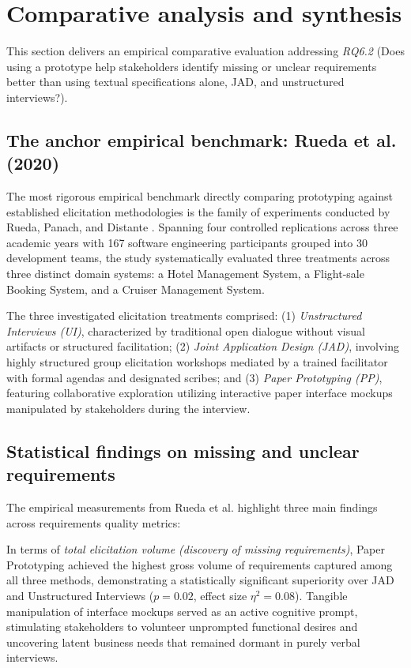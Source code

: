 \section{Comparative analysis and synthesis}
\label{sec:comparative}

This section delivers an empirical comparative evaluation addressing \textit{RQ6.2} (Does using a prototype help stakeholders identify missing or unclear requirements better than using textual specifications alone, JAD, and unstructured interviews?).

\subsection{The anchor empirical benchmark: Rueda et al. (2020)}
The most rigorous empirical benchmark directly comparing prototyping against established elicitation methodologies is the family of experiments conducted by Rueda, Panach, and Distante \cite{rueda2020requirements}. Spanning four controlled replications across three academic years with 167 software engineering participants grouped into 30 development teams, the study systematically evaluated three treatments across three distinct domain systems: a Hotel Management System, a Flight-sale Booking System, and a Cruiser Management System.

The three investigated elicitation treatments comprised: (1) \textit{Unstructured Interviews (UI)}, characterized by traditional open dialogue without visual artifacts or structured facilitation; (2) \textit{Joint Application Design (JAD)}, involving highly structured group elicitation workshops mediated by a trained facilitator with formal agendas and designated scribes; and (3) \textit{Paper Prototyping (PP)}, featuring collaborative exploration utilizing interactive paper interface mockups manipulated by stakeholders during the interview.

\subsection{Statistical findings on missing and unclear requirements}
The empirical measurements from Rueda et al. \cite{rueda2020requirements} highlight three main findings across requirements quality metrics:

In terms of \textit{total elicitation volume (discovery of missing requirements)}, Paper Prototyping achieved the highest gross volume of requirements captured among all three methods, demonstrating a statistically significant superiority over JAD and Unstructured Interviews ($p = 0.02$, effect size $\eta^2 = 0.08$). Tangible manipulation of interface mockups served as an active cognitive prompt, stimulating stakeholders to volunteer unprompted functional desires and uncovering latent business needs that remained dormant in purely verbal interviews.

